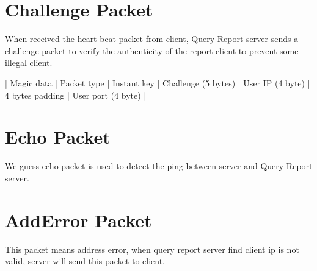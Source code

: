 \documentclass[oneside,titlepage,a4paper]{Definition/retrospy} %
\begin{document}
\section{Challenge Packet}
When received the heart beat packet from client, Query Report server sends a challenge packet to verify the authenticity of the report client to prevent some illegal client.
\ServerResponse 
\begin{mybox}
	| Magic data | Packet type | Instant key | Challenge (5 bytes) | User IP (4 byte) | 4 bytes padding | User port (4 byte) |
\end{mybox} 

\section{Echo Packet}
We guess echo packet is used to detect the ping between server and Query Report server.

\section{AddError Packet}
This packet means address error, when query report server find client ip is not valid, server will send this packet to client.



%

%
%
%

%

%
%
%
%
\end{document}
